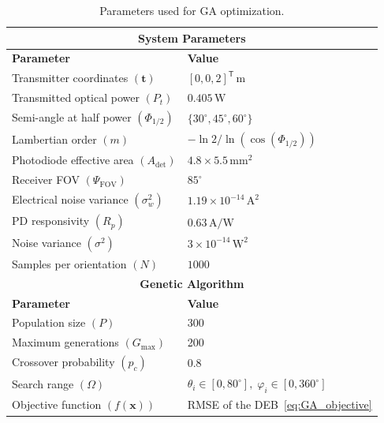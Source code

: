 \documentclass[journal]{IEEEtran}
\newcommand{\added}[1]{{\color{blue}#1}}
\begin{document}
\begin{table}[tbh]
\centering
\caption{Parameters used for GA optimization.}
\label{tab:ga_params}
\begin{tabular}{|l|l|}
\hline
\multicolumn{2}{|c|}{\textbf{System Parameters}} \\ \hline
\textbf{Parameter}                  & \textbf{Value}                         \\ \hline
Transmitter coordinates $(\mathbf{t})$ & \([0,0,2]^{\mathsf T}\,\mathrm{m}\)              \\ \hline
Transmitted optical power $(P_t)$   & \(0.405\,\mathrm{W}\)            \\ \hline
Semi-angle at half power  $(\Phi_{1/2})$ & \(\{30^\circ,45^\circ,60^\circ\}\)                \\ \hline
Lambertian order $(m)$              & \(-\ln2/\ln(\cos(\Phi_{1/2}))\)    \\ \hline
Photodiode effective area $(A_{\mathrm{det}})$        & \(4.8\times5.5\,\mathrm{mm}^2\) \\ \hline
Receiver FOV $(\Psi_{\mathrm{FOV}})$        & \(85^\circ\)       \\ \hline
Electrical noise variance $(\sigma_w^2)$ & \(1.19\times10^{-14}\,\mathrm{A}^2\) \\ \hline
PD responsivity $(R_{p})$ & \(0.63\,\mathrm{A/W}\)          \\ \hline
Noise variance $(\sigma^2)$         & \(3\times10^{-14}\,\mathrm{W}^2\) \\ \hline
Samples per orientation $(N)$       & \(1000\)                           \\ \hline
\multicolumn{2}{|c|}{\textbf{Genetic Algorithm}} \\ \hline
\textbf{Parameter}                  & \textbf{Value}                         \\ \hline
Population size $(P)$                    & 300                                    \\ \hline
Maximum generations $(G_{\mathrm{max}})$     & 200                                    \\ \hline
Crossover probability $(p_c)$       & 0.8                                    \\ \hline
Search range $(\Omega)$             & \(\theta_{i}\in[0,80^\circ],\;\varphi_{i}\in[0,360^\circ]\) \\ \hline
Objective function $(f(\mathbf x))$   & \added{RMSE of the DEB~\eqref{eq:GA_objective}}                        \\ \hline

\end{tabular}
\end{table}
\end{document}
